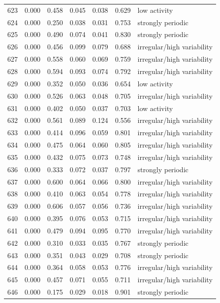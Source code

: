 \begin{longtable}{lrrrrrl}
623 & 0.000 & 0.458 & 0.045 & 0.038 & 0.629 & low activity \\
624 & 0.000 & 0.250 & 0.038 & 0.031 & 0.753 & strongly periodic \\
625 & 0.000 & 0.490 & 0.074 & 0.041 & 0.830 & strongly periodic \\
626 & 0.000 & 0.456 & 0.099 & 0.079 & 0.688 & irregular/high variability \\
627 & 0.000 & 0.558 & 0.060 & 0.069 & 0.759 & irregular/high variability \\
628 & 0.000 & 0.594 & 0.093 & 0.074 & 0.792 & irregular/high variability \\
629 & 0.000 & 0.352 & 0.050 & 0.036 & 0.654 & low activity \\
630 & 0.000 & 0.526 & 0.063 & 0.048 & 0.705 & irregular/high variability \\
631 & 0.000 & 0.402 & 0.050 & 0.037 & 0.703 & low activity \\
632 & 0.000 & 0.561 & 0.089 & 0.124 & 0.556 & irregular/high variability \\
633 & 0.000 & 0.414 & 0.096 & 0.059 & 0.801 & irregular/high variability \\
634 & 0.000 & 0.475 & 0.064 & 0.060 & 0.805 & irregular/high variability \\
635 & 0.000 & 0.432 & 0.075 & 0.073 & 0.748 & irregular/high variability \\
636 & 0.000 & 0.333 & 0.072 & 0.037 & 0.797 & strongly periodic \\
637 & 0.000 & 0.600 & 0.064 & 0.066 & 0.800 & irregular/high variability \\
638 & 0.000 & 0.410 & 0.063 & 0.054 & 0.778 & irregular/high variability \\
639 & 0.000 & 0.606 & 0.057 & 0.056 & 0.736 & irregular/high variability \\
640 & 0.000 & 0.395 & 0.076 & 0.053 & 0.715 & irregular/high variability \\
641 & 0.000 & 0.479 & 0.094 & 0.095 & 0.770 & irregular/high variability \\
642 & 0.000 & 0.310 & 0.033 & 0.035 & 0.767 & strongly periodic \\
643 & 0.000 & 0.351 & 0.043 & 0.029 & 0.708 & strongly periodic \\
644 & 0.000 & 0.364 & 0.058 & 0.053 & 0.776 & irregular/high variability \\
645 & 0.000 & 0.457 & 0.071 & 0.055 & 0.711 & irregular/high variability \\
646 & 0.000 & 0.175 & 0.029 & 0.018 & 0.901 & strongly periodic \\

\end{longtable}
